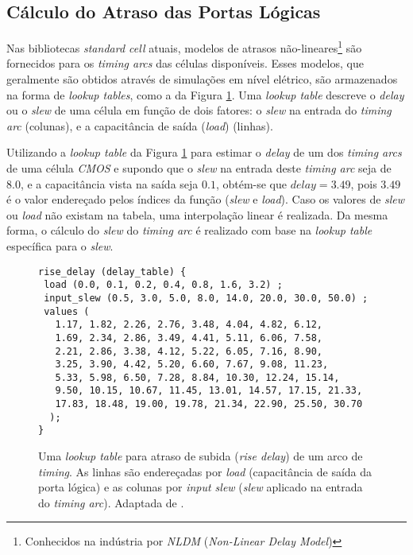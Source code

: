\documentclass[
	12pt,				%
	openright,			%
	twoside,			%
	a4paper,			%
	english,			%
	french,				%
	spanish,			%
	brazil,				%
	]{abntex2}
\begin{document}
\subsection{Cálculo do Atraso das Portas Lógicas}
Nas bibliotecas \textit{standard cell} atuais, modelos de atrasos não-lineares\footnote{Conhecidos na indústria por \textit{NLDM} (\textit{Non-Linear Delay Model})} são fornecidos para os \textit{timing arcs} das células disponíveis. Esses modelos, que geralmente são obtidos através de simulações em nível elétrico, são armazenados na forma de \textit{lookup tables}, como a da Figura \ref{fig:lookup_table}. Uma \textit{lookup table} descreve o \textit{delay} ou o \textit{slew} de uma célula em função de dois fatores: o \textit{slew} na entrada do \textit{timing arc} (colunas), e a capacitância de saída (\textit{load}) (linhas).

Utilizando a \textit{lookup table} da Figura \ref{fig:lookup_table} para estimar o \textit{delay} de um dos \textit{timing arcs} de uma célula \textit{CMOS} e supondo que o \textit{slew} na entrada deste \textit{timing arc} seja de $8.0$, e a capacitância vista na saída seja $0.1$, obtém-se que $delay = 3.49$, pois $3.49$ é o valor endereçado pelos índices da função (\textit{slew} e \textit{load}). Caso os valores de \textit{slew} ou \textit{load} não existam na tabela, uma interpolação linear é realizada. Da mesma forma, o cálculo do \textit{slew} do \textit{timing arc} é realizado com base na \textit{lookup table} específica para o \textit{slew}.

\begin{figure}[ht]
\lstset{basicstyle=\footnotesize}
\begin{lstlisting}[frame=single]
rise_delay (delay_table) {
 load (0.0, 0.1, 0.2, 0.4, 0.8, 1.6, 3.2) ;
 input_slew (0.5, 3.0, 5.0, 8.0, 14.0, 20.0, 30.0, 50.0) ;
 values (
   1.17, 1.82, 2.26, 2.76, 3.48, 4.04, 4.82, 6.12,
   1.69, 2.34, 2.86, 3.49, 4.41, 5.11, 6.06, 7.58,
   2.21, 2.86, 3.38, 4.12, 5.22, 6.05, 7.16, 8.90,
   3.25, 3.90, 4.42, 5.20, 6.60, 7.67, 9.08, 11.23,
   5.33, 5.98, 6.50, 7.28, 8.84, 10.30, 12.24, 15.14,
   9.50, 10.15, 10.67, 11.45, 13.01, 14.57, 17.15, 21.33,
   17.83, 18.48, 19.00, 19.78, 21.34, 22.90, 25.50, 30.70
  );
}
\end{lstlisting}
\caption{Uma \textit{lookup table} para atraso de subida (\textit{rise delay}) de um arco de \textit{timing}. As linhas são endereçadas por \textit{load} (capacitância de saída da porta lógica) e as colunas por \textit{input slew} (\textit{slew} aplicado na entrada do \textit{timing arc}). Adaptada de \cite{Contest2013}.}
\label{fig:lookup_table}
\end{figure}
\end{document}
